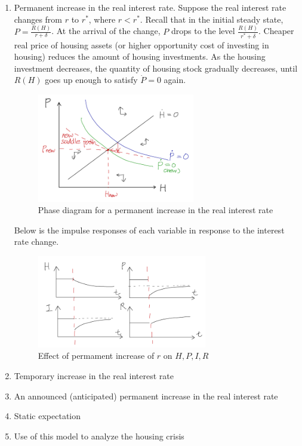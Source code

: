 \documentclass[11pt]{amsart}
\begin{document}
\begin{enumerate}[label=(\alph*)]
\item Permanent increase in the real interest rate. Suppose the real interest rate changes from $r$ to $r^{*}$, where $r < r^{*}$. Recall that in the initial steady state, $P = \frac{R(H)}{r+\delta}$. At the arrival of the change, $P$ drops to the level $\frac{R(H)}{r^{*} + \delta}$. Cheaper real price of housing assets (or higher opportunity cost of investing in housing) reduces the amount of housing investments. As the housing investment decreases, the quantity of housing stock gradually decreases, until $R(H)$ goes up enough to satisfy $\dot{P}=0$ again.   
\begin{figure}[H]
	\centering
	\includegraphics[width=0.65\textwidth]{1e1_Minki.png}
	\caption{Phase diagram for a permanent increase in the real interest rate}
\end{figure}
Below is the impulse responses of each variable in response to the interest rate change. 
\begin{figure}[H]
	\centering
	\includegraphics[width=0.7\textwidth]{1e2_Minki.png}
	\caption{Effect of permament increase of $r$ on $H,P,I,R$ }
\end{figure}
\item Temporary increase in the real interest rate 
\item An announced (anticipated) permanent increase in the real interest rate
\item Static expectation
\item Use of this model to analyze the housing crisis
\end{enumerate}
\end{document}
